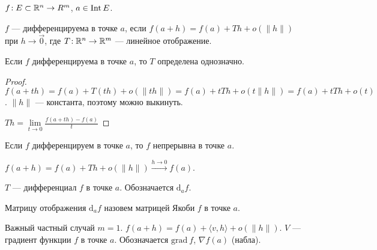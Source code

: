 \begin{definition}
    $f\!: E \subset \mathbb{R}^n \to R^m$,  $a \in \operatorname{Int} E$.

     $f$ --- дифференцируема в точке  $a$, если  $f(a+h) = f(a) + Th + o(\|h\|)$ при  $h \to \overrightarrow{0}$, где  $T\!: \mathbb{R}^n \to \mathbb{R}^m$ --- линейное отображение.
\end{definition}
\begin{remark}
    Если $f$ дифференцируема в точке  $a$, то  $T$ определена однозначно. 
\end{remark}
\begin{proof}
    $f(a+th) = f(a) + T(th) + o(\|th\|) = f(a) + tTh + o(t\|h\|) = f(a) + tTh + o(t)$. $\|h\|$ --- константа, поэтому можно выкинуть.

     $Th = \lim\limits_{t \to 0} \frac{f(a+th) - f(a)}{t}$
\end{proof}
\begin{remark}
    Если $f$ дифференцируем в точке  $a$, то  $f$ непрерывна в точке  $a$.

     $f(a+h) = f(a) + Th + o(\|h\|) \xrightarrow{h \to 0} f(a)$.
\end{remark}
\begin{definition}
    $T$ --- дифференциал $f$ в точке  $a$. Обозначается  $\mathrm{d}_af$. 
\end{definition}
\begin{definition}
    Матрицу отображения $\mathrm{d}_af$ назовем матрицей Якоби  $f$ в точке  $a$.
\end{definition}

Важный частный случай $m = 1$.  $f(a+h) = f(a) + \langle v, h \rangle + o(\| h\|)$. $V$ --- градиент функции  $f$ в точке  $a$. Обозначается  $\text{grad}\ f$,  $\nabla f(a)$ (набла).

